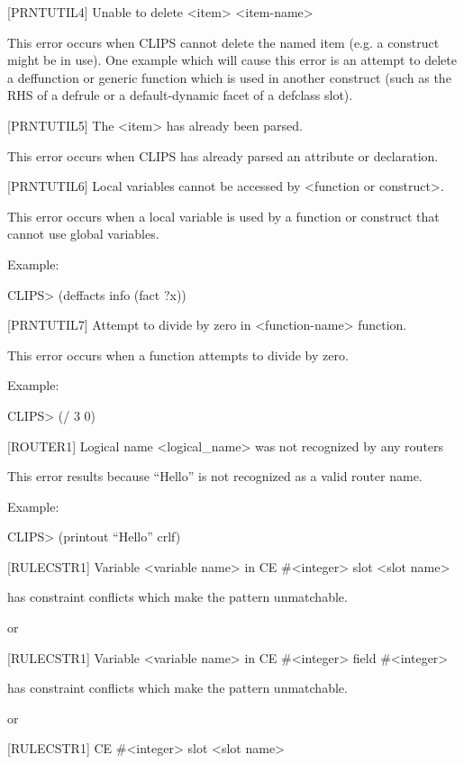 \documentclass[letterpaper,10pt,english]{sphinxmanual}
\begin{document}
{[}PRNTUTIL4{]} Unable to delete \textless{}item\textgreater{} \textless{}item-name\textgreater{}

This error occurs when CLIPS cannot delete the named item (e.g. a
construct might be in use). One example which will cause this error is
an attempt to delete a deffunction or generic function which is used in
another construct (such as the RHS of a defrule or a default-dynamic
facet of a defclass slot).

{[}PRNTUTIL5{]} The \textless{}item\textgreater{} has already been parsed.

This error occurs when CLIPS has already parsed an attribute or
declaration.

{[}PRNTUTIL6{]} Local variables cannot be accessed by \textless{}function or
construct\textgreater{}.

This error occurs when a local variable is used by a function or
construct that cannot use global variables.

Example:

CLIPS\textgreater{} (deffacts info (fact ?x))

{[}PRNTUTIL7{]} Attempt to divide by zero in \textless{}function-name\textgreater{} function.

This error occurs when a function attempts to divide by zero.

Example:

CLIPS\textgreater{} (/ 3 0)

{[}ROUTER1{]} Logical name \textless{}logical\_name\textgreater{} was not recognized by any routers

This error results because “Hello” is not recognized as a valid router
name.

Example:

CLIPS\textgreater{} (printout “Hello” crlf)

{[}RULECSTR1{]} Variable \textless{}variable name\textgreater{} in CE \#\textless{}integer\textgreater{} slot \textless{}slot name\textgreater{}

has constraint conflicts which make the pattern unmatchable.

or

{[}RULECSTR1{]} Variable \textless{}variable name\textgreater{} in CE \#\textless{}integer\textgreater{} field \#\textless{}integer\textgreater{}

has constraint conflicts which make the pattern unmatchable.

or

{[}RULECSTR1{]} CE \#\textless{}integer\textgreater{} slot \textless{}slot name\textgreater{}
\end{document}
